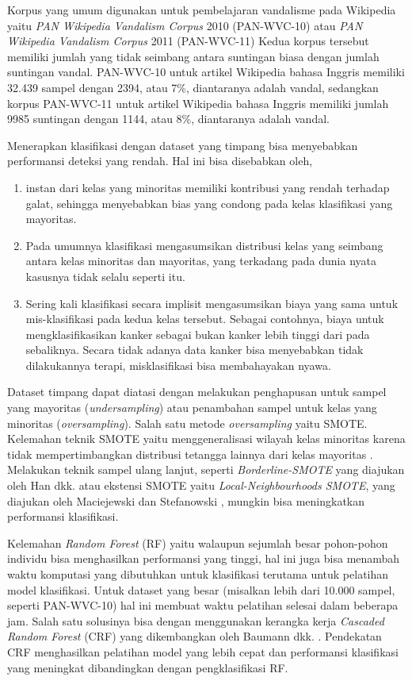 Korpus yang umum digunakan untuk pembelajaran vandalisme pada Wikipedia yaitu
\textit{PAN Wikipedia Vandalism Corpus} 2010 (PAN-WVC-10)
\cite{potthast:2010b}
atau
\textit{PAN Wikipedia Vandalism Corpus} 2011 (PAN-WVC-11)
\cite{potthast:2010b}
Kedua korpus tersebut memiliki jumlah yang tidak seimbang antara suntingan
biasa dengan jumlah suntingan vandal.
PAN-WVC-10 untuk artikel Wikipedia bahasa Inggris memiliki 32.439 sampel dengan
2394, atau 7\%, diantaranya adalah vandal, sedangkan korpus PAN-WVC-11 untuk
artikel Wikipedia bahasa Inggris memiliki jumlah 9985 suntingan dengan 1144,
atau 8\%, diantaranya adalah vandal.

\newpage
Menerapkan klasifikasi dengan dataset yang timpang bisa menyebabkan performansi
deteksi yang rendah.
Hal ini bisa disebabkan oleh,
\begin{enumerate}
	\item instan dari kelas yang minoritas memiliki kontribusi yang rendah
	terhadap galat, sehingga menyebabkan bias yang condong pada kelas
	klasifikasi yang mayoritas.
	\item Pada umumnya klasifikasi mengasumsikan distribusi kelas yang
	seimbang antara kelas minoritas dan mayoritas, yang terkadang pada
	dunia nyata kasusnya tidak selalu seperti itu.
	\item Sering kali klasifikasi secara implisit mengasumsikan biaya yang
	sama untuk mis-klasifikasi pada kedua kelas tersebut.
	Sebagai contohnya, biaya untuk mengklasifikasikan kanker sebagai bukan
	kanker lebih tinggi dari pada sebaliknya.
	Secara tidak adanya data kanker bisa menyebabkan tidak dilakukannya
	terapi, misklasifikasi bisa membahayakan nyawa.
\end{enumerate}

Dataset timpang dapat diatasi dengan melakukan penghapusan untuk sampel yang
mayoritas (\textit{undersampling}) atau penambahan sampel untuk kelas
yang minoritas (\textit{oversampling}).
Salah satu metode \textit{oversampling} yaitu SMOTE.
Kelemahan teknik SMOTE yaitu menggeneralisasi wilayah kelas
minoritas karena tidak mempertimbangkan distribusi tetangga lainnya dari
kelas mayoritas
\cite{maciejewski2011local}.
Melakukan teknik sampel ulang lanjut, seperti
\textit{Borderline-SMOTE}
yang diajukan oleh Han dkk.
\cite{han2005borderline}
atau ekstensi SMOTE yaitu \textit{Local-Neighbourhoods SMOTE}, yang diajukan
oleh Maciejewski dan Stefanowski
\cite{maciejewski2011local},
mungkin bisa meningkatkan performansi klasifikasi.

Kelemahan \textit{Random Forest} (RF) yaitu walaupun sejumlah besar pohon-pohon
individu bisa menghasilkan performansi yang tinggi, hal ini juga bisa menambah
waktu komputasi yang dibutuhkan untuk klasifikasi terutama untuk pelatihan
model klasifikasi.
Untuk dataset yang besar (misalkan lebih dari 10.000 sampel, seperti
PAN-WVC-10) hal ini membuat waktu pelatihan selesai dalam beberapa jam.
Salah satu solusinya bisa dengan menggunakan kerangka kerja
\textit{Cascaded Random Forest} (CRF)
yang dikembangkan oleh Baumann dkk.
\cite{baumann2013cascaded}.
Pendekatan CRF menghasilkan pelatihan model yang lebih cepat dan performansi
klasifikasi yang meningkat dibandingkan dengan pengklasifikasi RF.

